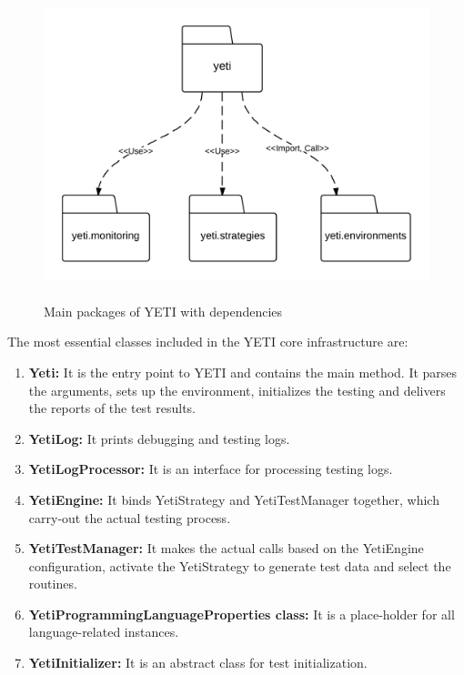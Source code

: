 \bigskip
\begin{figure}[h]
	\centering
	\includegraphics[width=14cm, height=9cm]{chapter3/yetiStructure.png}
	\smallskip
	\caption{Main packages of YETI with dependencies }
	\label{fig:yetiCore}
\end{figure}
\bigskip
\bigskip
\bigskip
The most essential classes included in the YETI core infrastructure are:
\begin{enumerate}
\item {\textbf{Yeti:}} It is the entry point to YETI and contains the main method. It parses the arguments, sets up the environment, initializes the testing and delivers the reports of the test results.
\item {\textbf{YetiLog:}} It prints debugging and testing logs. 
\item {\textbf{YetiLogProcessor:}} It is an interface for processing testing logs.
\item {\textbf{YetiEngine:}} It binds YetiStrategy and YetiTestManager together, which carry-out the actual testing process.
\item {\textbf{YetiTestManager:}} It makes the actual calls based on the YetiEngine configuration, activate the YetiStrategy to generate test data and select the routines.
\item {\textbf{YetiProgrammingLanguageProperties class:}} It is a place-holder for all language-related instances.
\item {\textbf{YetiInitializer:}} It is an abstract class for test initialization.
\end{enumerate}

